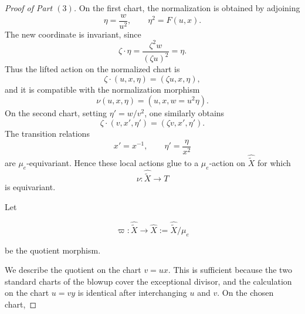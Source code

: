 \documentclass[11pt,twoside]{amsart}
\theoremstyle{plain}
\numberwithin{equation}{section}
\theoremstyle{definition}
\begin{document}
\begin{proof}[Proof of Part $(3)$]
On the first chart, the normalization is obtained by adjoining
\[
\eta=\frac{w}{u^2},
\qquad
\eta^2=F(u,x).
\]
The new coordinate is invariant, since
\[
\zeta\cdot\eta
=
\frac{\zeta^2w}{(\zeta u)^2}
=
\eta.
\]
Thus the lifted action on the normalized chart is
\[
\zeta\cdot(u,x,\eta)=(\zeta u,x,\eta),
\]
and it is compatible with the normalization morphism
\[
\nu(u,x,\eta)=(u,x,w=u^2\eta).
\]
On the second chart, setting $\eta'=w/v^2$, one similarly obtains
\[
\zeta\cdot(v,x',\eta')=(\zeta v,x',\eta').
\]
The transition relations
\[
x'=x^{-1},
\qquad
\eta'=\frac{\eta}{x^2}
\]
are $\mu_e$-equivariant. Hence these local actions glue to a $\mu_e$-action on $\widehat{\widetilde X}$ for which
\[
\nu:\widehat{\widetilde X}\longrightarrow T
\]
is equivariant.
\endgroup


Let

$$
\varpi:\widehat{\widetilde X}\longrightarrow
\widehat X:=\widehat{\widetilde X}/\mu_e
$$

be the quotient morphism.

We describe the quotient on the chart $v=ux$. This is sufficient because the two standard charts of the blowup cover the exceptional divisor, and the calculation on the chart $u=vy$ is identical after interchanging $u$ and $v$. On the chosen chart,


\end{proof}
\end{document}
